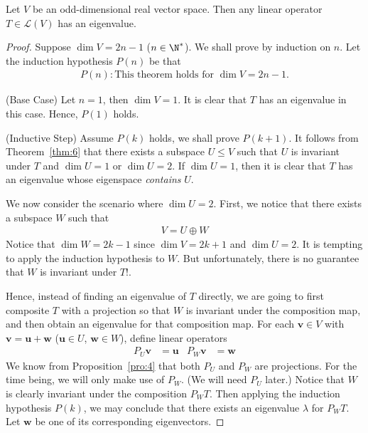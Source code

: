 \documentclass[thmcnt=section, color=blue, 12pt]{my-elegantbook}
\begin{document}

\begin{theorem}
    Let $V$ be an odd-dimensional real vector space. Then any linear operator $T \in \mathcal{L}(V)$ has an eigenvalue.
\end{theorem}

\begin{proof}
    Suppose $\dim V = 2n - 1$ ($n \in \N^\ast$). We shall prove by induction on $n$. Let the induction hypothesis $P(n)$ be that 
    \begin{align*}
        P(n): \text{This theorem holds for $\dim V = 2n-1$.}
    \end{align*}

    \par (Base Case) Let $n = 1$, then $\dim V = 1$. It is clear that $T$ has an eigenvalue in this case. Hence, $P(1)$ holds.

    \par (Inductive Step) Assume $P(k)$ holds, we shall prove $P(k+1)$. It follows from Theorem~\ref{thm:6} that there exists a subspace $U \leq V$ such that $U$ is invariant under $T$ and $\dim U = 1$ or $\dim U = 2$. If $\dim U = 1$, then it is clear that $T$ has an eigenvalue whose eigenspace \textit{contains} $U$. 
    
    \par We now consider the scenario where $\dim U = 2$. First, we notice that there exists a subspace $W$ such that 
    \begin{align*}
        V = U \oplus W
    \end{align*}
    Notice that $\dim W = 2k-1$ since $\dim V = 2k+1$ and $\dim U = 2$. It is tempting to apply the induction hypothesis to $W$. But unfortunately, there is no guarantee that $W$ is invariant under $T$!.
    
    \par Hence, instead of finding an eigenvalue of $T$ directly, we are going to first composite $T$ with a projection so that $W$ is invariant under the composition map, and then obtain an eigenvalue for that composition map. For each $\mathbf{v} \in V$ with $\mathbf{v} = \mathbf{u} + \mathbf{w}$ ($\mathbf{u} \in U$, $\mathbf{w} \in W$), define linear operators
    \begin{align*}
        P_U \mathbf{v} &= \mathbf{u} &
        P_W \mathbf{v} &= \mathbf{w}
    \end{align*}
    We know from Proposition~\ref{pro:4} that both $P_U$ and $P_W$ are projections. For the time being, we will only make use of $P_W$. (We will need $P_U$ later.) Notice that $W$ is clearly invariant under the composition $P_W T$. Then applying the induction hypothesis $P(k)$, we may conclude that there exists an eigenvalue $\lambda$ for $P_W T$. Let $\mathbf{w}$ be one of its corresponding eigenvectors.


\end{proof}
\end{document}
